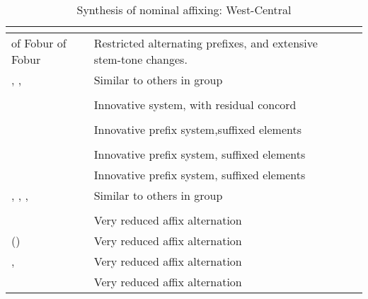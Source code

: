 \documentclass[output=paper]{langsci/langscibook}
\begin{document}
\begin{table} 
\small
\caption{Synthesis of nominal affixing: West-Central} 
\begin{tabularx}{\textwidth}{p{3cm}Qp{2.8cm}@{}}
\lsptoprule
 \textbf{}\\
\midrule
   of Fobur  of Fobur 	& Restricted alternating prefixes, and extensive stem-tone changes. 	& \citet{Blench2000b}\\
\raggedright	  {}, ,  	& Similar to others in group 	&   \\
\tablevspace
 \textbf{}\\
\midrule
    	& Innovative system, with  residual concord 	&{\raggedright  {\citet{Anon2006}} \mbox{\citet{BlenchGya2012}}}\\
\tablevspace
{}\\
\midrule
    	& Innovative prefix system,\newline suffixed elements 	&  {\citet{McKinney1979}}\newline\citet{Hyuwa1986}\\
\tablevspace
\textbf{ }\\
\midrule
    	& Innovative prefix system, suffixed elements 	& {\citet{Follingstad1991}} \\
	   	& Innovative prefix system, suffixed elements 	& \citet{AdwiraahHagen1983}\\
\raggedright	  {}, , ,  	& Similar to others in group 	& \\
\tablevspace
\textbf{}\\
\midrule
   	& Very reduced affix alternation 	& \\
\raggedright	  {} ()	& Very reduced affix alternation 	&  \\
	  ,  	& Very reduced affix alternation 	& \\
	   	& Very reduced affix alternation 	& \\
%  

\end{tabularx}
\end{table}
\end{document}
